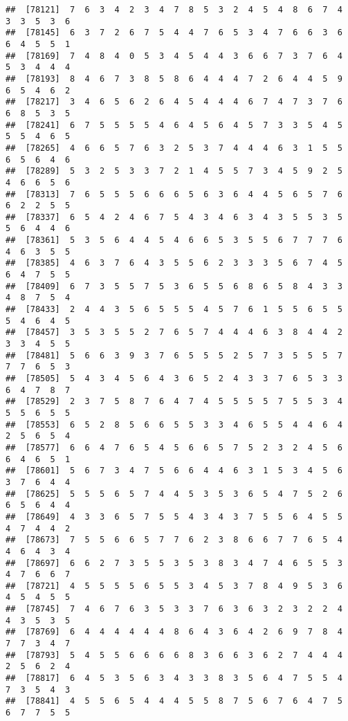 \documentclass[
]{book}
\begin{document}
\begin{verbatim}
##  [78121]  7  6  3  4  2  3  4  7  8  5  3  2  4  5  4  8  6  7  4  3  3  5  3  6
##  [78145]  6  3  7  2  6  7  5  4  4  7  6  5  3  4  7  6  6  3  6  6  4  5  5  1
##  [78169]  7  4  8  4  0  5  3  4  5  4  4  3  6  6  7  3  7  6  4  5  3  4  4  4
##  [78193]  8  4  6  7  3  8  5  8  6  4  4  4  7  2  6  4  4  5  9  6  5  4  6  2
##  [78217]  3  4  6  5  6  2  6  4  5  4  4  4  6  7  4  7  3  7  6  6  8  5  3  5
##  [78241]  6  7  5  5  5  5  4  6  4  5  6  4  5  7  3  3  5  4  5  5  5  4  6  5
##  [78265]  4  6  6  5  7  6  3  2  5  3  7  4  4  4  6  3  1  5  5  6  5  6  4  6
##  [78289]  5  3  2  5  3  3  7  2  1  4  5  5  7  3  4  5  9  2  5  4  6  6  5  6
##  [78313]  7  6  5  5  5  6  6  6  5  6  3  6  4  4  5  6  5  7  6  6  2  2  5  5
##  [78337]  6  5  4  2  4  6  7  5  4  3  4  6  3  4  3  5  5  3  5  5  6  4  4  6
##  [78361]  5  3  5  6  4  4  5  4  6  6  5  3  5  5  6  7  7  7  6  4  6  3  5  5
##  [78385]  4  6  3  7  6  4  3  5  5  6  2  3  3  3  5  6  7  4  5  6  4  7  5  5
##  [78409]  6  7  3  5  5  7  5  3  6  5  5  6  8  6  5  8  4  3  3  4  8  7  5  4
##  [78433]  2  4  4  3  5  6  5  5  5  4  5  7  6  1  5  5  6  5  5  5  4  6  4  5
##  [78457]  3  5  3  5  5  2  7  6  5  7  4  4  4  6  3  8  4  4  2  3  3  4  5  5
##  [78481]  5  6  6  3  9  3  7  6  5  5  5  2  5  7  3  5  5  5  7  7  7  6  5  3
##  [78505]  5  4  3  4  5  6  4  3  6  5  2  4  3  3  7  6  5  3  3  6  4  7  8  7
##  [78529]  2  3  7  5  8  7  6  4  7  4  5  5  5  5  7  5  5  3  4  5  5  6  5  5
##  [78553]  6  5  2  8  5  6  6  5  5  3  3  4  6  5  5  4  4  6  4  2  5  6  5  4
##  [78577]  6  6  4  7  6  5  4  5  6  6  5  7  5  2  3  2  4  5  6  6  4  6  5  1
##  [78601]  5  6  7  3  4  7  5  6  6  4  4  6  3  1  5  3  4  5  6  3  7  6  4  4
##  [78625]  5  5  5  6  5  7  4  4  5  3  5  3  6  5  4  7  5  2  6  6  5  6  4  4
##  [78649]  4  3  3  6  5  7  5  5  4  3  4  3  7  5  5  6  4  5  5  4  7  4  4  2
##  [78673]  7  5  5  6  6  5  7  7  6  2  3  8  6  6  7  7  6  5  4  4  6  4  3  4
##  [78697]  6  6  2  7  3  5  5  3  5  3  8  3  4  7  4  6  5  5  3  4  7  6  6  7
##  [78721]  4  5  5  5  5  6  5  5  3  4  5  3  7  8  4  9  5  3  6  4  5  4  5  5
##  [78745]  7  4  6  7  6  3  5  3  3  7  6  3  6  3  2  3  2  2  4  4  3  5  3  5
##  [78769]  6  4  4  4  4  4  4  8  6  4  3  6  4  2  6  9  7  8  4  7  7  3  4  7
##  [78793]  5  4  5  5  6  6  6  6  8  3  6  6  3  6  2  7  4  4  4  2  5  6  2  4
##  [78817]  6  4  5  3  5  6  3  4  3  3  8  3  5  6  4  7  5  5  4  7  3  5  4  3
##  [78841]  4  5  5  6  5  4  4  4  5  5  8  7  5  6  7  6  4  7  5  6  7  7  5  5

\end{verbatim}
\end{document}
